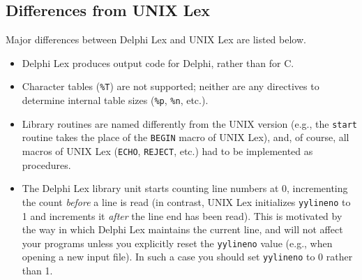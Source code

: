 \documentclass[a4paper]{article}
\begin{document}
\subsection{Differences from UNIX Lex}

Major differences between Delphi Lex and UNIX Lex are listed below.

\begin{itemize}
   \item
      Delphi Lex produces output code for Delphi, rather than for C.
   \item
      Character tables (\verb"%T") are not supported; neither are any
      directives to determine internal table sizes (\verb"%p", \verb"%n",
      etc.).
   \item
      Library routines are named differently from the UNIX version (e.g.,
      the \verb"start" routine takes the place of the \verb"BEGIN" macro of
      UNIX Lex), and, of course, all macros of UNIX Lex (\verb"ECHO",
      \verb"REJECT", etc.) had to be implemented as procedures.
    \item
      The Delphi Lex library unit starts counting line numbers at 0, incrementing
      the count {\em before\/} a line is read (in contrast, UNIX Lex
      initializes \verb"yylineno" to 1 and increments it {\em after\/} the
      line end has been read). This is motivated by the way in which Delphi Lex
      maintains the current line, and will not affect your programs unless you
      explicitly reset the \verb"yylineno" value (e.g., when opening a new
      input file). In such a case you should set \verb"yylineno" to 0 rather
      than 1.
\end{itemize}
\end{document}
